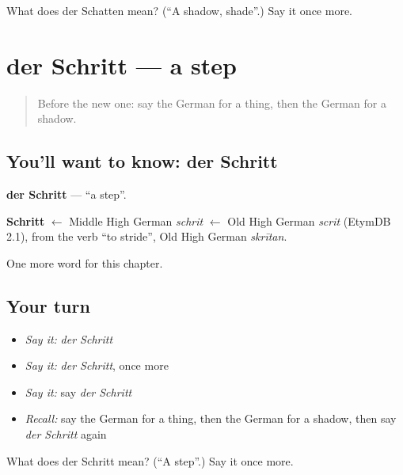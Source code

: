 \begin{tcolorbox}[breakable,colback=teal!4,colframe=teal!35!black,title={Before you move on}]
What does der Schatten mean? (\textquotedblleft{}A shadow, shade\textquotedblright{}.) Say it once more.
\end{tcolorbox}
\section[der Schritt]{der Schritt — a step}

\label{lesson:GE-C237-schritt}



\begin{quote}
Before the new one: say the German for a thing, then the German for a shadow.
\end{quote}

\subsection*{You'll want to know: der Schritt}
\textbf{der Schritt} — \textquotedblleft{}a step\textquotedblright{}.

\begin{cousinweb}
\textbf{Schritt} $\leftarrow$ Middle High German \emph{schrit} $\leftarrow$ Old High German \emph{scrit} (EtymDB 2.1), from the verb \textquotedblleft{}to stride\textquotedblright{}, Old High German \emph{skrītan}.
\end{cousinweb}

\begin{grammarlens}[title={What you've built}]
One more word for this chapter.
\end{grammarlens}

\subsection*{Your turn}
\begin{itemize}
\raggedright
  \item \emph{Say it:} \emph{der Schritt}
  \item \emph{Say it:} \emph{der Schritt}, once more
  \item \emph{Say it:} say \emph{der Schritt}
  \item \emph{Recall:} say the German for a thing, then the German for a shadow, then say \emph{der Schritt} again
\end{itemize}

\begin{tcolorbox}[breakable,colback=teal!4,colframe=teal!35!black,title={Before you move on}]
What does der Schritt mean? (\textquotedblleft{}A step\textquotedblright{}.) Say it once more.
\end{tcolorbox}
